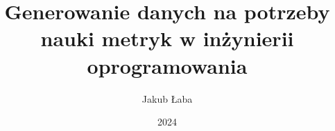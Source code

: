 \documentclass[thesis=inz,faculty=ee]{EE-dyplom}
\title{Generowanie danych na potrzeby nauki metryk w inżynierii oprogramowania}
\author{Jakub Łaba}
\date{2024}
\begin{document}
    \frontpages

    

    \bibliografia

    
\end{document}
